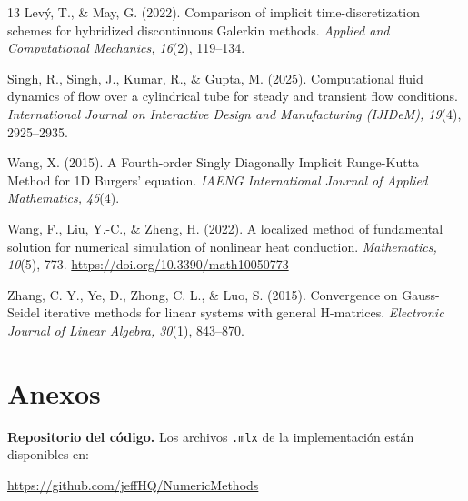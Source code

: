 \documentclass[final,5p,times,twocolumn,authoryear,11pt]{elsarticle}
\begin{document}
\begin{thebibliography}{13}
Lev{\'y}, T., \& May, G. (2022). Comparison of implicit time-discretization schemes for hybridized discontinuous Galerkin methods. \textit{Applied and Computational Mechanics, 16}(2), 119--134.

Singh, R., Singh, J., Kumar, R., \& Gupta, M. (2025). Computational fluid dynamics of flow over a cylindrical tube for steady and transient flow conditions. \textit{International Journal on Interactive Design and Manufacturing (IJIDeM), 19}(4), 2925--2935.

Wang, X. (2015). A Fourth-order Singly Diagonally Implicit Runge-Kutta Method for 1D Burgers' equation. \textit{IAENG International Journal of Applied Mathematics, 45}(4). 

Wang, F., Liu, Y.-C., \& Zheng, H. (2022). A localized method of fundamental solution for numerical simulation of nonlinear heat conduction. \textit{Mathematics, 10}(5), 773. \url{https://doi.org/10.3390/math10050773}

Zhang, C. Y., Ye, D., Zhong, C. L., \& Luo, S. (2015). Convergence on Gauss-Seidel iterative methods for linear systems with general H-matrices. \textit{Electronic Journal of Linear Algebra, 30}(1), 843--870.

\end{thebibliography}

\section*{Anexos}
\textbf{Repositorio del código.} Los archivos \texttt{.mlx} de la
implementación están disponibles en:

\url{https://github.com/jeffHQ/NumericMethods}
\end{document}
